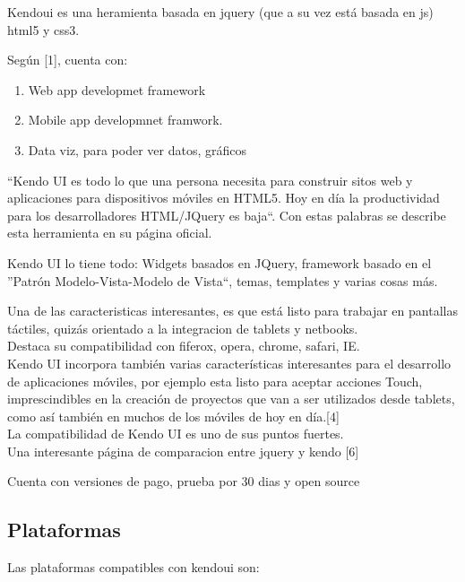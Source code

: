 

Kendoui es una heramienta basada en jquery (que a su vez está basada en js) html5 y css3.

Según [1], cuenta con:
\begin{enumerate}
 \item  Web app developmet framework
 \item Mobile app developmnet framwork.
 \item Data viz, para poder ver datos, gráficos
\end{enumerate}



``Kendo UI es todo lo que una persona necesita para construir sitos web y aplicaciones para dispositivos móviles
en HTML5. Hoy en día la productividad para los desarrolladores HTML/JQuery es baja``. Con estas palabras se describe
esta herramienta en su página oficial.

Kendo UI lo tiene todo: Widgets basados en JQuery, framework basado en el ''Patrón Modelo-Vista-Modelo de Vista``,
temas, templates y varias cosas más.

Una de las caracteristicas interesantes, es que está listo
para trabajar en pantallas táctiles, quizás orientado a la integracion de tablets y netbooks.\\

Destaca su compatibilidad con fiferox, opera, chrome, safari, IE.\\

Kendo UI incorpora también varias características interesantes para el desarrollo de aplicaciones móviles,
por ejemplo esta listo para aceptar acciones Touch, imprescindibles en la creación de proyectos que van a 
ser utilizados desde tablets, como así también en muchos de los móviles de hoy en día.[4]\\

La compatibilidad de Kendo UI es uno de sus puntos fuertes.\\

Una interesante página de comparacion entre jquery y kendo [6]

Cuenta con versiones de pago, prueba por 30 dias y open source

\subsection{Plataformas}
Las plataformas compatibles con kendoui son:

